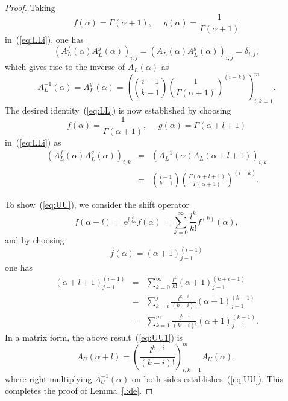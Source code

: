 \documentclass[pdflatex,sn-mathphys-num]{sn-jnl}%
\theoremstyle{thmstyleone}
\newcommand{\dd}{\,\mathrm{d}}
\newcommand{\ee}{\,\mathrm{e}}
\begin{document}
\begin{proof}
Taking
\begin{equation}
f(\alpha)=\Gamma(\alpha+1),~~~~~~g(\alpha)=\frac{1}{\Gamma(\alpha+1)}
\end{equation}
in~(\ref{eq:LLi}), one has
\begin{equation}
\left(A_{L}^{f}(\alpha)A_{L}^{g}(\alpha)\right)_{i,j}=\left(A_{L}(\alpha)A_{L}^{g}(\alpha)\right)_{i,j}=\delta_{i,j},
\end{equation}
which gives rise to the inverse of $A_{L}(\alpha)$ as
\begin{equation}\label{eq:inL}
A_{L}^{-1}(\alpha)=A_{L}^{g}(\alpha)=\left(\binom{i-1}{k-1}\left(\frac{1}{\Gamma(\alpha+1)}\right)^{(i-k)}\right)_{i,k=1}^{m}.
\end{equation}
The desired identity~(\ref{eq:LL}) is now established by choosing
\begin{equation}
f(\alpha)=\frac{1}{\Gamma(\alpha+1)},~~~~~~g(\alpha)=\Gamma(\alpha+l+1)
\end{equation}
in~(\ref{eq:LLi}) as
\begin{eqnarray}
\left(A_{L}^{f}(\alpha)A_{L}^{g}(\alpha)\right)_{i,k} &=& \left(A_{L}^{-1}(\alpha)A_{L}(\alpha+l+1)\right)_{i,k} \\
&=& \binom{i-1}{k-1}\left(\frac{\Gamma(\alpha+l+1)}{\Gamma(\alpha+1)}\right)^{(i-k)}.
\end{eqnarray}

To show~(\ref{eq:UU}), we consider the shift operator
\begin{equation}
f(\alpha+l)=\ee^{l\frac{\dd}{\dd\alpha}}f(\alpha)=\sum_{k=0}^{\infty}\frac{l^{k}}{k!}f^{(k)}(\alpha),
\end{equation}
and by choosing
\begin{equation}
f(\alpha)=(\alpha+1)^{(i-1)}_{j-1}
\end{equation}
one has
\begin{eqnarray}
(\alpha+l+1)^{(i-1)}_{j-1} &=& \sum_{k=0}^{\infty}\frac{l^{k}}{k!}(\alpha+1)^{(k+i-1)}_{j-1} \\
&=& \sum_{k=i}^{j}\frac{l^{k-i}}{(k-i)!}(\alpha+1)^{(k-1)}_{j-1} \\
&=& \sum_{k=1}^{m}\frac{l^{k-i}}{(k-i)!}(\alpha+1)^{(k-1)}_{j-1}. \label{eq:UU1}
\end{eqnarray}
In a matrix form, the above result~(\ref{eq:UU1}) is
\begin{equation}
A_{U}(\alpha+l)=\left(\frac{l^{k-i}}{(k-i)!}\right)_{i,k=1}^{m}A_{U}(\alpha),
\end{equation}
where right multiplying $A^{-1}_{U}(\alpha)$ on both sides establishes~(\ref{eq:UU}). This completes the proof of Lemma~\ref{l:de}.
\end{proof}
\end{document}
